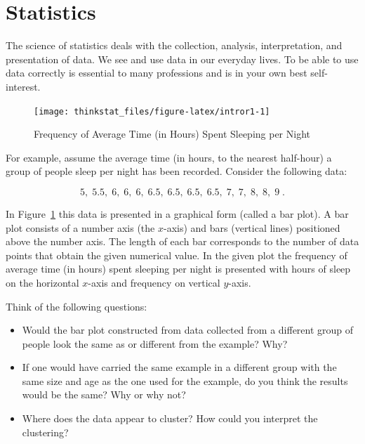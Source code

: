 \documentclass[]{krantz}
\theoremstyle{definition}
\theoremstyle{definition}
\theoremstyle{definition}
\theoremstyle{remark}
\begin{document}
\section{Statistics}\label{statistics}

The science of statistics deals with the collection, analysis,
interpretation, and presentation of data. We see and use data in our
everyday lives. To be able to use data correctly is essential to many
professions and is in your own best self-interest.

\begin{figure}

{\centering \texttt{[image: thinkstat\_files/figure-latex/intror1-1]} 

}

\caption{Frequency of Average Time (in Hours) Spent Sleeping per Night}\label{fig:intror1}
\end{figure}

For example, assume the average time (in hours, to the nearest
half-hour) a group of people sleep per night has been recorded. Consider
the following data:

\[5,\; 5.5,\; 6,\; 6,\; 6,\; 6.5,\; 6.5,\; 6.5,\; 6.5,\; 7,\; 7,\; 8,\; 8,\; 9\;.\]

In Figure~\ref{fig:intror1} this data is presented in a graphical form
(called a bar plot). A bar plot consists of a number axis (the
\(x\)-axis) and bars (vertical lines) positioned above the number axis.
The length of each bar corresponds to the number of data points that
obtain the given numerical value. In the given plot the frequency of
average time (in hours) spent sleeping per night is presented with hours
of sleep on the horizontal \(x\)-axis and frequency on vertical
\(y\)-axis.

Think of the following questions:

\begin{itemize}
\item
  Would the bar plot constructed from data collected from a different
  group of people look the same as or different from the example? Why?
\item
  If one would have carried the same example in a different group with
  the same size and age as the one used for the example, do you think
  the results would be the same? Why or why not?
\item
  Where does the data appear to cluster? How could you interpret the
  clustering?
\end{itemize}
\end{document}
